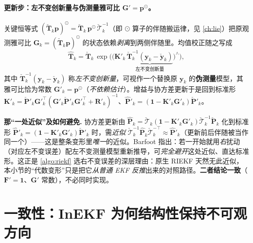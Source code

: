 \paragraph{更新步：左不变创新量与伪测量雅可比 $\mathbf{G}'=\mathbf{p}^\odot$。}
关键恒等式 $(\check{\mathbf{T}}_k\mathbf{p})^\odot=\check{\mathbf{T}}_k\,\mathbf{p}^\odot\,\check{\boldsymbol{\mathcal{T}}}_k^{-1}$（即 $\odot$ 算子的伴随搬运律，见 \cref{ch:lie}）把原观测雅可比 $\mathbf{G}_k=(\check{\mathbf{T}}_k\mathbf{p})^\odot$ 的状态依赖\emph{剥离}到两侧伴随里。均值校正随之写成
\begin{equation}
  \hat{\mathbf{T}}_k=\check{\mathbf{T}}_k\,\exp\!\Big(\big(\mathbf{K}'_k\,\underbrace{\check{\mathbf{T}}_k^{-1}(\mathbf{y}_k-\check{\mathbf{y}}_k)}_{\text{左不变创新量}}\big)^\wedge\Big),
  \label{eq:c4-update}
\end{equation}
其中 $\check{\mathbf{T}}_k^{-1}(\mathbf{y}_k-\check{\mathbf{y}}_k)$ 称\emph{左不变创新量}，可视作一个替换原 $\mathbf{y}_k$ 的\textbf{伪测量}模型，其雅可比恰为常数 $\mathbf{G}'_k=\mathbf{p}^\odot$（\emph{不依赖估计}）。增益与协方差更新于是回到标准形 $\mathbf{K}'_k=\check{\mathbf{P}}'_k\mathbf{G}'^\top_k(\mathbf{G}'_k\check{\mathbf{P}}'_k\mathbf{G}'^\top_k+\mathbf{R}'_k)^{-1}$、$\hat{\mathbf{P}}'_k=(\mathbf{1}-\mathbf{K}'_k\mathbf{G}'_k)\check{\mathbf{P}}'_k$。

\begin{note}
\textbf{那“一处近似”及如何避免.}\;
协方差更新由 $\hat{\mathbf{P}}_k=\check{\boldsymbol{\mathcal{T}}}_k(\mathbf{1}-\mathbf{K}'_k\mathbf{G}'_k)\check{\boldsymbol{\mathcal{T}}}_k^{-1}\check{\mathbf{P}}_k$ 化到标准形 $\hat{\mathbf{P}}'_k=(\mathbf{1}-\mathbf{K}'_k\mathbf{G}'_k)\check{\mathbf{P}}'_k$ 时，需\emph{近似} $\check{\boldsymbol{\mathcal{T}}}_k^{-1}\hat{\mathbf{P}}_k\check{\boldsymbol{\mathcal{T}}}_k^{-\top}\approx\hat{\mathbf{P}}'_k$（更新前后伴随被当作同一个）——这是整条变形里\emph{唯一}的近似\cite{barfoot2024state}。Barfoot 指出：若一开始就用\emph{右}扰动（对应左不变误差）配左不变测量模型重新推导，可\emph{完全避开}这处近似、直达标准形。这正是 \cref{algo:riekf} 选右不变误差的深层理由：原生 RIEKF 天然无此近似，本小节的“代数变形”只是把它\emph{从普通 EKF 反推}出来的对照路径。\textbf{二者结论一致}（$\mathbf{F}'=\mathbf{1}$、$\mathbf{G}'$ 常数），不必同时实现。
\end{note}

\section{一致性：InEKF 为何结构性保持不可观方向}
\label{sec:consistency-inekf}

